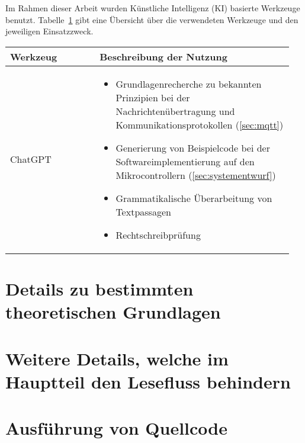 \setcounter{chapter}{1}

Im Rahmen dieser Arbeit wurden Künstliche Intelligenz (KI) basierte Werkzeuge benutzt. Tabelle~\ref{tab:anhang_uebersicht_KI_werkzeuge} gibt eine Übersicht über die verwendeten Werkzeuge und den jeweiligen Einsatzzweck.

\begin{table}[hbt]	
	\centering
	\renewcommand{\arraystretch}{1.5}	%
	\label{tab:anhang_uebersicht_KI_werkzeuge}
	\begin{tabular}{>{\raggedright\arraybackslash}p{0.3\linewidth} >{\raggedright\arraybackslash}p{0.65\linewidth}}
		\textbf{Werkzeug} & \textbf{Beschreibung der Nutzung}\\
		\hline 
		\hline
		ChatGPT & 	\vspace{-\topsep}
					\begin{itemize}[noitemsep,topsep=0pt,partopsep=0pt,parsep=0pt] 
						\item Grundlagenrecherche zu bekannten Prinzipien bei der Nachrichtenübertragung und Kommunikationsprotokollen (\autoref{sec:mqtt})
						\item Generierung von Beispielcode bei der Softwareimplementierung auf den Mikrocontrollern (\autoref{sec:systementwurf})
						\item Grammatikalische Überarbeitung von
						Textpassagen
						\item Rechtschreibprüfung
				   	\end{itemize} \\
		\hline 
	\end{tabular} 
\end{table}

\setcounter{chapter}{2}

\section{Details zu bestimmten theoretischen Grundlagen}

\section{Weitere Details, welche im Hauptteil den Lesefluss behindern}

\section{Ausführung von Quellcode}

